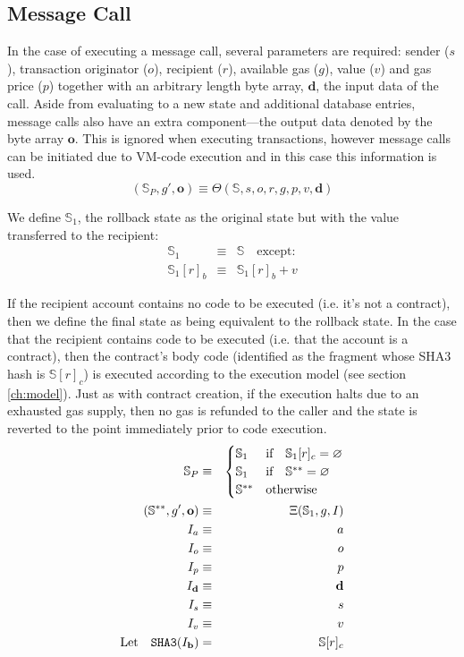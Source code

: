 \documentclass[9pt,oneside]{amsart}
\begin{document}
\begin{multicols}{2}
\section{Message Call} \label{ch:call}

In the case of executing a message call, several parameters are required: sender ($s$), transaction originator ($o$), recipient ($r$), available gas ($g$), value ($v$) and gas price ($p$) together with an arbitrary length byte array, $\mathbf{d}$, the input data of the call. Aside from evaluating to a new state and additional database entries, message calls also have an extra component---the output data denoted by the byte array $\mathbf{o}$. This is ignored when executing transactions, however message calls can be initiated due to VM-code execution and in this case this information is used.
\begin{equation}
(\mathbb{S}_P, g', \mathbf{o}) \equiv \Theta(\mathbb{S}, s, o, r, g, p, v, \mathbf{d})
\end{equation}

We define $\mathbb{S}_1$, the rollback state as the original state but with the value transferred to the recipient:
\begin{eqnarray}
\mathbb{S}_1 & \equiv & \mathbb{S} \quad \text{except:} \\
\mathbb{S}_1[r]_b & \equiv & \mathbb{S}_1[r]_b + v
\end{eqnarray}

If the recipient account contains no code to be executed (i.e. it's not a contract), then we define the final state as being equivalent to the rollback state. In the case that the recipient contains code to be executed (i.e. that the account is a contract), then the contract's body code (identified as the fragment whose SHA3 hash is $\mathbb{S}[r]_c$) is executed according to the execution model (see section \ref{ch:model}). Just as with contract creation, if the execution halts due to an exhausted gas supply, then no gas is refunded to the caller and the state is reverted to the point immediately prior to code execution.
\begin{eqnarray}
\mathbb{S}_P & \equiv & \begin{cases}
\mathbb{S}_1 & \text{if} \quad \mathbb{S}_1[r]_c = \varnothing \\
\mathbb{S}_1 & \text{if} \quad \mathbb{S}^{**} = \varnothing \\
\mathbb{S}^{**} & \text{otherwise}
\end{cases} \\
(\mathbb{S}^{**}, g', \mathbf{o}) & \equiv & \Xi(\mathbb{S}_1, g, I) \\
I_a & \equiv & a \\
I_o & \equiv & o \\
I_p & \equiv & p \\
I_\mathbf{d} & \equiv & \mathbf{d} \\
I_s & \equiv & s \\
I_v & \equiv & v \\
\text{Let} \quad \mathtt{\tiny SHA3}(I_\mathbf{b}) & = & \mathbb{S}[r]_c
\end{eqnarray}


\end{multicols}
\end{document}
